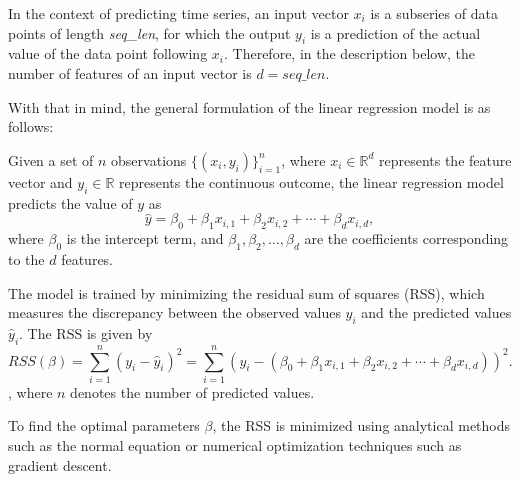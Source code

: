 In the context of predicting time series, an input vector \(x_i\) is a subseries of data points of length \textit{seq\_len}, for which the output \(y_i\) is a prediction of the actual value of the data point following \(x_i\). Therefore, in the description below, the number of features of an input vector is \(d = \textit{seq\_len}\).

With that in mind, the general formulation of the linear regression model is as follows:

Given a set of \(n\) observations \(\{(x_i, y_i)\}_{i=1}^n\), where \(x_i \in \mathbb{R}^d\) represents the feature vector and \(y_i \in \mathbb{R}\) represents the continuous outcome, the linear regression model predicts the value of \(y\) as
\[
	\hat{y} = \beta_0 + \beta_1 x_{i,1} + \beta_2 x_{i,2} + \cdots + \beta_d x_{i,d},
\]
where \(\beta_0\) is the intercept term, and \(\beta_1, \beta_2, \ldots, \beta_d\) are the coefficients corresponding to the \(d\) features.

The model is trained by minimizing the residual sum of squares (RSS), which measures the discrepancy between the observed values \(y_i\) and the predicted values \(\hat{y}_i\). The RSS is given by
\[
	RSS(\beta) = \sum_{i=1}^n (y_i - \hat{y}_i)^2 = \sum_{i=1}^n \left(y_i - (\beta_0 + \beta_1 x_{i,1} + \beta_2 x_{i,2} + \cdots + \beta_d x_{i,d})\right)^2.
\],
where \(n\) denotes the number of predicted values.

To find the optimal parameters \(\beta\), the RSS is minimized using analytical methods such as the normal equation or numerical optimization techniques such as gradient descent.








